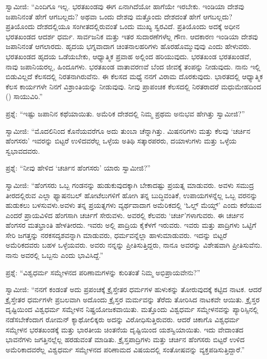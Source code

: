 ಸ್ವಾಮೀಜಿ: “ಎಂದಿಗೂ ಇಲ್ಲ. ಭರತಖಂಡವು ಈಗ ಏನಾಗಿದೆಯೋ ಹಾಗೆಯೇ ಇರಬೇಕು. ಇಂಡಿಯಾ ದೇಶವು ಜಪಾನಿನಂತೆ ಹೇಗೆ ಆಗಬಲ್ಲದು? ಅಥವಾ ಒಂದು ದೇಶವು ಮತ್ತೊಂದು ದೇಶದಂತೆ ಹೇಗೆ ಆಗಬಲ್ಲದು? ಪ್ರತಿಯೊಂದು ದೇಶದಲ್ಲಿಯೂ ಸಂಗೀತದಲ್ಲಿರುವಂತೆ ಒಂದು ಮುಖ್ಯ ಸ್ವರವಿದೆ. ಪ್ರತಿಯೊಂದು ಅದಕ್ಕೆ ಅಧೀನ ಭರತಖಂಡದ ಆದರ್ಶ ಧರ್ಮ. ಸಾರ್ವಜನಿಕ ಮತ್ತು ಇತರ ಸುದಾರಣೆಗಳೆಲ್ಲ ಗೌಣ. ಆದಕಾರಣ ಇಂಡಿಯಾ ದೇಶವು ಜಪಾನಿನಂತೆ ಆಗಲಾರದು. ಹೃದಯ ಭಗ್ನವಾದಾಗ ಚಿಂತನಾಲಹರಿಗಳು ಹೊರಹೊಮ್ಮುವುವು ಎಂದು ಹೇಳುವರು. ಭರತಖಂಡದ ಹೃದಯ ಒಡೆಯಬೇಕು, ಆಧ್ಯಾತ್ಮಿಕ ಪ್ರವಾಹ ಅಲ್ಲಿಂದ ಹರಿಯುವುದು. ಭರತಖಂಡ ಭರತಖಂಡವೆ, ನಾವು ಜಪಾನಿಯರಲ್ಲ, ಹಿಂದೂಗಳು. ಭರತಖಂಡ ವಾತಾವರಣವೆ ಬೆಂದ ಜೀವಕ್ಕೆ ತಂಪನ್ನು ನೀಡುವುದು. ನಾನು ಇಲ್ಲಿ ಬಿಡುವಿಲ್ಲದೆ ಕೆಲಸದಲ್ಲಿ ನಿರತನಾಗಿರುವೆನು. ಈ ಕೆಲಸದ ಮಧ್ಯೆ ನನಗೆ ವಿರಾಮ ದೊರಕುವುದು. ಭಾರತದಲ್ಲಿ ಆಧ್ಯಾತ್ಮಿಕ ಕೆಲಸ ಕಾರ್ಯಗಳೇ ನಿನಗೆ ವಿಶ್ರಾಂತಿಯನ್ನು ನೀಡುವುವು. ನೀವು ಪ್ರಾಪಂಚಿಕ ಕೆಲಸದಲ್ಲಿ ನಿರತರಾದರೆ ಮಧುಮೇಹದಿಂದ () ಸಾಯುವಿರಿ.”

ಪ್ರಶ್ನೆ: “ಇಷ್ಟು ಜಪಾನಿನ ಕಥೆಯಾಯಿತು. ಅಮೆರಿಕ ದೇಶದಲ್ಲಿ ನಿಮ್ಮ ಪ್ರಥಮ ಅನುಭವ ಹೇಗಿತ್ತು ಸ್ವಾಮೀಜಿ?”

ಸ್ವಾಮೀಜಿ: “ಮೊದಲಿನಿಂದ ಕೊನೆಯವರೆಗೂ ಅದು ತುಂಬಾ ಚೆನ್ನಾಗಿತ್ತು. ಮಿಷನರಿಗಳು ಮತ್ತು ಕೆಲವು ‘ಚರ್ಚಿನ ಹೆಂಗಸರು’ ಇವರನ್ನು ಬಿಟ್ಟರೆ ಉಳಿದವರೆಲ್ಲ ಒಳ್ಳೆಯ ಅತಿಥಿ ಸತ್ಕಾರಪರರು, ದಯಾಳುಗಳು ಮತ್ತು ಒಳ್ಳೆಯ ಸ್ವಭಾವದವರು.

ಪ್ರಶ್ನೆ: “ನೀವು ಹೇಳಿದ ‘ಚರ್ಚಿನ ಹೆಂಗಸರು’ ಯಾರು ಸ್ವಾಮೀಜಿ?”

ಸ್ವಾಮೀಜಿ: “ಹೆಂಗಸರು ಒಬ್ಬ ಗಂಡನನ್ನು ಹುಡುಕುವುದಕ್ಕಾಗಿ ಬೇಕಾದಷ್ಟು ಪ್ರಯತ್ನ ಮಾಡುವರು. ಅವಳು ಸಮುದ್ರ ತೀರದಲ್ಲಿರುವ ಎಲ್ಲಾ ಫ್ಯಾಷನಬಲ್​ ಹೋಟೆಲುಗಳಿಗೆ ಹೋಗಿ ತನ್ನ ಬುದ್ಧಿವಂತಿಕೆ, ಉಪಾಯಗಳನ್ನೆಲ್ಲ ಒಬ್ಬ ವರನನ್ನು ಹುಡುಕಲು ಬಳಸುವಳು.\break ಅವಳು ತನ್ನ ಪ್ರಯತ್ನಗಳು ವ್ಯರ್ಥವಾದಾಗ ಅಮೆರಿಕದಲ್ಲಿ ‘ಓಲ್ಡ್​ ಮೆಯ್ಡ್​’ ಎಂದು ಕರೆಯುವ ಎಂದರೆ ಪ್ರಾಯವಿಳಿದ ಹೆಂಗಸಾಗಿ ಚರ್ಚಿಗೆ ಸೇರುವಳು. ಅವರಲ್ಲಿ ಕೆಲವರು ‘ಚರ್ಚಿ’ಗಳಾಗುವರು. ಈ ಚರ್ಚಿನ ಹೆಂಗಸರ ಮತಭ್ರಾಂತಿ ಹೇಳತೀರದು. ಇವರು ಅಲ್ಲಿ ಪಾದ್ರಿಯ ಕೈಕೆಳಗೆ ಇರುವರು. ಇವರು ಮತ್ತು ಪಾದ್ರಿಗಳು ಒಟ್ಟಿಗೆ ಸೇರಿ ಜಗತ್ತನ್ನು ನರಕಸದೃಶವನ್ನಾಗಿ ಮಾಡುವರು, ಧರ್ಮವನ್ನೆಲ್ಲಾ ಹಾಳುಮಾಡುವರು. ಇದನ್ನು ಬಿಟ್ಟರೆ ಅಮೆರಿಕದವರು ಬಹಳ ಒಳ್ಳೆಯವರು. ಅವರು ನನ್ನನ್ನು ಪ್ರೀತಿಸುತ್ತಿದ್ದರು, ನಾನೂ ಅವರನ್ನು ವಿಶೇಷವಾಗಿ ಪ್ರೀತಿಸುವೆನು. ನಾನು ಅವರಲ್ಲಿ ಒಬ್ಬನು ಎಂದು ಭಾವಿಸಿದ್ದೆ.”

ಪ್ರಶ್ನೆ: “ವಿಶ್ವಧರ್ಮ ಸಮ್ಮೇಳನದ ಪರಿಣಾಮಗಳನ್ನು ಕುರಿತಂತೆ ನಿಮ್ಮ ಅಭಿಪ್ರಾಯವೇನು?”

ಸ್ವಾಮೀಜಿ: “ನನಗೆ ಕಂಡಂತೆ ಅದು ಪ್ರಪಂಚಕ್ಕೆ ಕ್ರೈಸ್ತೇತರ ಧರ್ಮಗಳ ಹುಳುಕನ್ನು ತೋರುವುದಕ್ಕೆ ಕಟ್ಟಿದ ನಾಟಕ. ಆದರೆ ಕ್ರೈಸ್ತೇತರ ಧರ್ಮಗಳೇ ಪ್ರಬಲವಾಗಿ ಅದೊಂದು ಕ್ರೈಸ್ತರ ಮರ್ಮವನ್ನು ತೆರೆದು ತೋರಿಸಿದ ನಾಟಕವೇ ಆಯಿತು. ಕ್ರೈಸ್ತರ ದೃಷ್ಟಿಯಿಂದ ವಿಶ್ವಧರ್ಮ ಸಮ್ಮೇಳನ ನಿಷ್ಪ್ರಯೋಜಕವಾಯಿತು. ಮತ್ತೊಂದು ವಿಶ್ವಧರ್ಮ ಸಮ್ಮೇಳನವನ್ನು ಪ್ಯಾರಿಸ್ಸಿನಲ್ಲಿ ನಡೆಸಬೇಕೆಂದಾಗ ರೋಮನ್​ ಕ್ಯಾಥೋಲಿಕ್ಕರು ಅದನ್ನು ವಿರೋಧಿಸುತ್ತಿರುವರು. ಆದರೆ ಚಿಕಾಗೊ ವಿಶ್ವಧರ್ಮ ಸಮ್ಮೇಳನ ಭರತಖಂಡಕ್ಕೆ ಮತ್ತು ಭಾರತೀಯ ಚಿಂತನೆಯ ದೃಷ್ಟಿಯಿಂದ ಯಶಸ್ವಿಯಾಯಿತು. ಇದು ವೇದಾಂತದ ಭಾವನೆಗಳು ಜಗತ್ತಿನಲ್ಲೆಲ್ಲ ಹರಡುವಂತೆ ಮಾಡಿತು. ಕ್ರೈಸ್ತಪಾದ್ರಿಗಳು ಮತ್ತು ಚರ್ಚಿನ ಹೆಂಗಸರು ಬಿಟ್ಟರೆ ಉಳಿದ ಅಮೆರಿಕಾದವರೆಲ್ಲ ವಿಶ್ವಧರ್ಮ ಸಮ್ಮೇಳನದ ಪರಿಣಾಮದ ವಿಷಯದಲ್ಲಿ ಸಂತೋಷವನ್ನು ವ್ಯಕ್ತಪಡಿಸುತ್ತಿದ್ದಾರೆ.”

